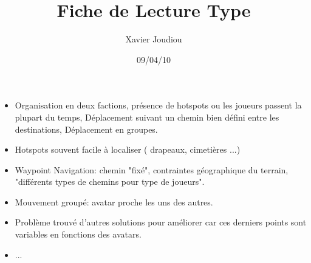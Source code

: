 \documentclass[11pt,a4paper]{article}
\title{Fiche de Lecture Type}
\author{Xavier Joudiou}
\date{09/04/10}
\begin{document}
	
  \begin{itemize}
  \renewcommand{\labelitemi}{$\Rightarrow$}
	\item Organisation en deux factions, présence de hotspots ou les joueurs passent la plupart du temps, Déplacement suivant un chemin bien défini entre les destinations, Déplacement en groupes. 
	\item Hotspots souvent facile à localiser ( drapeaux, cimetières ...)
	\item Waypoint Navigation: chemin "fixé", contraintes géographique du terrain, "différents types de chemins pour type de joueurs".
	\item Mouvement groupé: avatar proche les uns des autres.
	\item Problème trouvé d'autres solutions pour améliorer car ces derniers points sont variables en fonctions des avatars.
	\item ...
  \end{itemize}
\end{document}
